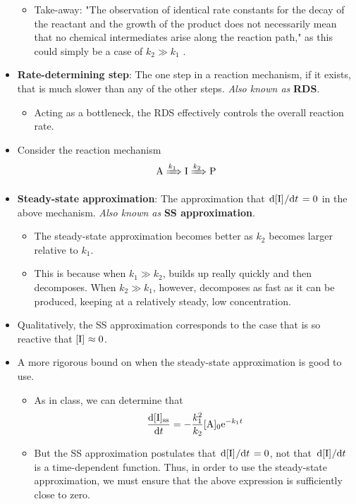 \documentclass[../notes.tex]{subfiles}
\begin{document}
\begin{itemize}
    \begin{itemize}
        \item Take-away: "The observation of identical rate constants for the decay of the reactant and the growth of the product does not necessarily mean that no chemical intermediates arise along the reaction path," as this could simply be a case of $k_2\gg k_1$ \parencite[1189]{bib:McQuarrieSimon}.
    \end{itemize}
    \item \textbf{Rate-determining step}: The one step in a reaction mechanism, if it exists, that is much slower than any of the other steps. \emph{Also known as} \textbf{RDS}.
    \begin{itemize}
        \item Acting as a bottleneck, the RDS effectively controls the overall reaction rate.
    \end{itemize}
    \item Consider the reaction mechanism
    \begin{equation*}
        \ce{A} \xRightarrow{k_1} \ce{I}
        \xRightarrow{k_2} \ce{P}
    \end{equation*}
    \item \textbf{Steady-state approximation}: The approximation that $\dv*{\cnc{I}}{t}=0$ in the above mechanism. \emph{Also known as} \textbf{SS approximation}.
    \begin{itemize}
        \item The steady-state approximation becomes better as $k_2$ becomes larger relative to $k_1$.
        \item This is because when $k_1\gg k_2$,  builds up really quickly and then decomposes. When $k_2\gg k_1$, however,  decomposes as fast as it can be produced, keeping  at a relatively steady, low concentration.
    \end{itemize}
    \item Qualitatively, the SS approximation corresponds to the case that  is so reactive that $\cnc{I}\approx 0$.
    \item A more rigorous bound on when the steady-state approximation is good to use.
    \begin{itemize}
        \item As in class, we can determine that
        \begin{equation*}
            \dv{\cnc[ss]{I}}{t} = -\frac{k_1^2}{k_2}\cnc[0]{A}\e[-k_1t]
        \end{equation*}
        \item But the SS approximation postulates that $\dv*{\cnc{I}}{t}=0$, not that $\dv*{\cnc{I}}{t}$ is a time-dependent function. Thus, in order to use the steady-state approximation, we must ensure that the above expression is sufficiently close to zero.

\end{itemize}
\end{itemize}
\end{document}
